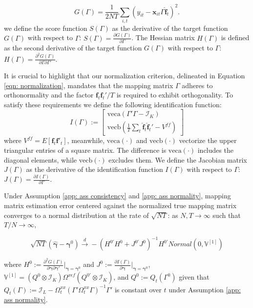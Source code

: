 \documentclass[12pt]{article}
\begin{document}
\begin{equation}
\label{eqn: target}
G(\Gamma) = \frac{1}{2NT}\sum_{i,t} \left( y_{it} - \bm{x}_{it}\Gamma \bm{\hat{f}}_t \right)^2.
\end{equation}
we define the score function $S(\Gamma)$ as the derivative of the target function $G(\Gamma)$ with respect to $\Gamma$: $S(\Gamma) = \frac{\partial G(\Gamma)}{\partial \Gamma}$. The Hessian matrix $H(\Gamma)$ is defined as the second derivative of the target function $G(\Gamma)$ with respect to $\Gamma$: $H(\Gamma) = \frac{\partial^2 G(\Gamma)}{\partial \Gamma \partial \Gamma'}$. 

It is crucial to highlight that our normalization criterion, delineated in Equation \ref{eqn: normalization}, mandates that the mapping matrix $\Gamma$ adheres to orthonormality and the factor $\bm{f}_t\bm{f}_t'/T$ is required to exhibit orthogonality. To satisfy these requirements we define the following identification function:
\begin{equation}
\label{eqn: identification}
I(\Gamma) := \begin{bmatrix}
    \text{veca}(\Gamma' \Gamma - \mathcal{I}_K) \\
    \text{vecb}\left(\frac{1}{T} \sum_{t} \bm{\hat{f}}_t\bm{\hat{f}}_t' - V^{ff}\right)
    \end{bmatrix}
\end{equation}
where $V^{ff} = E\left[\bm{f}_t\bm{f}'_t\right]$, meanwhile, $\text{veca}(\cdot)$ and $\text{vecb}(\cdot)$ vectorize the upper triangular entries of a square matrix. The difference is $\text{veca}(\cdot)$ includes the diagonal elements, while $\text{vecb}(\cdot)$ excludes them. We define the Jacobian matrix $J(\Gamma)$ as the derivative of the identification function $I(\Gamma)$ with respect to $\Gamma$: $J(\Gamma) = \frac{\partial I(\Gamma)}{\partial \Gamma}$.

\begin{proposition}
\label{prop: gamma}
Under Assumption \ref{app: ass consistency} and \ref{app: ass normality}, mapping matrix estimation error centered against the normalized true mapping matrix converges to a normal distribution at the rate of $\sqrt{NT}$: as $N, T \rightarrow \infty$ such that $T/N \rightarrow \infty$,

$$
\sqrt{NT} \left( \hat{\bm{\gamma}} - \bm{\gamma}^0 \right) \xrightarrow{d} - \left( H^{0'}H^0 + J^{0'}J^0 \right)^{-1}H^{0'}Normal(0, \mathbb{V}^{[1]})
$$
\end{proposition}
where $H^0:= \frac{\partial^2 G(\Gamma)}{\partial \bm{\gamma}\partial \bm{\gamma}'}|_{\bm{\gamma} = \bm{\gamma}^0}$ and $J^0:= \frac{\partial I(\Gamma)}{\partial \bm{\gamma}}|_{\bm{\gamma} = \bm{\gamma}^0}$, $\mathbb{V}^{[1]} = \left( Q^0 \otimes \mathcal{I}_K \right) \Omega^{x\epsilon f} \left( Q^{0'} \otimes \mathcal{I}_K \right)$, and $Q^0 := Q_t(\Gamma^0)$ given that $Q_t(\Gamma) := \mathcal{I}_L - \Omega_t^{xx} \left( \Gamma' \Omega^{xx}_t \Gamma \right)^{-1}\Gamma'$ is constant over $t$ under Assumption \ref{app: ass normality}.
\end{document}
